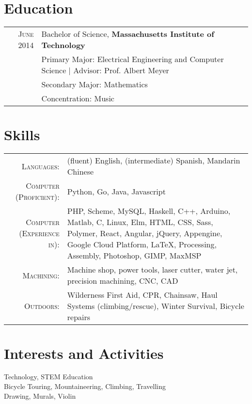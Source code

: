 \documentclass[a4paper,10pt]{article}
\begin{document}
\section{Education}
\begin{tabular}{rl}	
 \textsc{June 2014} & Bachelor of Science, \textbf{Massachusetts Institute of Technology}\\
& Primary Major: Electrical Engineering and Computer Science | \small Advisor: Prof. Albert Meyer\\
& Secondary Major: Mathematics\\
& Concentration: Music\\
\end{tabular}

\section{Skills}
 \begin{tabular}{rp{11cm}}
 \textsc{Languages}:& (fluent) English, (intermediate) Spanish, Mandarin Chinese\\
 \textsc{Computer (Proficient)}:& Python, Go, Java, Javascript\\
 \textsc{Computer (Experience in)}:& PHP, Scheme, MySQL, Haskell, C++, Arduino, Matlab, C, Linux, Elm, HTML, CSS, Sass, Polymer, React, Angular, jQuery, Appengine, Google Cloud Platform, \LaTeX, Processing, Assembly, Photoshop, GIMP, MaxMSP\\
 \textsc{Machining}:& Machine shop, power tools, laser cutter, water jet, precision machining, CNC, CAD\\
\textsc{Outdoors}:& Wilderness First Aid, CPR, Chainsaw, Haul Systems (climbing/rescue), Winter Survival, Bicycle repairs\\
\end{tabular}
\section{Interests and Activities}
Technology, STEM Education\\
Bicycle Touring, Mountaineering, Climbing, Travelling\\
Drawing, Murals, Violin\\
\end{document}
